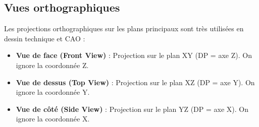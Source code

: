 \subsection{Vues orthographiques}
Les projections orthographiques sur les plans principaux sont très utilisées en dessin technique et CAO :
\begin{itemize}
    \item \textbf{Vue de face (Front View)} : Projection sur le plan XY (DP = axe Z). On ignore la coordonnée Z.
    \item \textbf{Vue de dessus (Top View)} : Projection sur le plan XZ (DP = axe Y). On ignore la coordonnée Y.
    \item \textbf{Vue de côté (Side View)} : Projection sur le plan YZ (DP = axe X). On ignore la coordonnée X.
\end{itemize}
